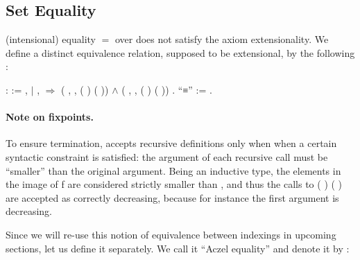 \subsection{Set Equality}

\Coq{} (intensional) equality $=$ over  does not satisfy the axiom extensionality. We define a distinct equivalence relation, supposed to be extensional, by the following :

\begin{coqdoccode}
  \coqdocnoindent
      :  :=\coqdoceol
  \coqdocindent{1.00em}
   ,  \coqdoceol
  \coqdocindent{1.00em}
  \ensuremath{|}   ,    \ensuremath{\Rightarrow}\coqdoceol
  \coqdocindent{2.00em}
  (\coqdockw{\ensuremath{\forall}} , \coqdoctac{\ensuremath{\exists}} ,  ( ) ( )) \ensuremath{\land} (\coqdockw{\ensuremath{\forall}} , \coqdoctac{\ensuremath{\exists}} ,  ( ) ( ))\coqdoceol
  \coqdocindent{1.00em}
  .\coqdoceol
  \coqdocnoindent
{} ``≡'' := .\coqdoceol
\coqdocemptyline
\end{coqdoccode}

\paragraph{Note on fixpoints.} To ensure termination, \Coq{} accepts recursive definitions only when when a certain syntactic constraint is satisfied: the argument of each recursive call must be ``smaller'' than the original argument. Being  an inductive type, the elements in the image of \var f are considered strictly smaller than   , and thus the calls to  ( ) ( ) are accepted as correctly decreasing, because for instance the first argument is decreasing.

\medskip

Since we will re-use this notion of equivalence between indexings in upcoming sections, let us define it separately. We call it ``Aczel equality'' and denote it by \AEQ:

